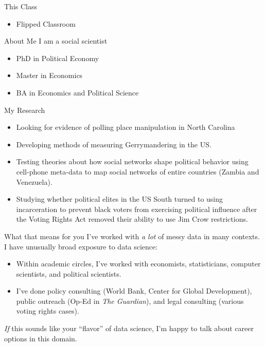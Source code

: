 \documentclass[11pt]{beamer}
\begin{document}
\begin{frame}[c]{This Class}
\begin{itemize}
	\item Flipped Classroom
\end{itemize}
\end{frame}

\begin{frame}[c]{About Me}
	I am a social scientist \\
	\vspace{0.5cm}
	\begin{itemize}
		\pause \item PhD in Political Economy
		\pause \item Master in Economics
		\pause \item BA in Economics and Political Science
	\end{itemize}
\end{frame}

\begin{frame}[c]{My Research}
	\begin{itemize}
		\pause \item Looking for evidence of polling place manipulation in North Carolina
		\pause \item Developing methods of measuring Gerrymandering in the US.
		\pause \item Testing theories about how social networks shape political behavior using cell-phone meta-data to map social networks of entire countries (Zambia and Venezuela).
		\pause \item Studying whether political elites in the US South turned to using incarceration to prevent black voters from exercising political influence after the Voting Rights Act removed their ability to use Jim Crow restrictions.
	\end{itemize}
\end{frame}

\begin{frame}[c]{What that means for you}
\pause I've worked with \emph{a lot} of messy data in many contexts. \\
\pause I have unusually broad exposure to data science:
\begin{itemize}
	\pause \item Within academic circles, I've worked with economists, statisticians, computer scientists, and political scientists.
	\pause \item I've done \alert{policy consulting} (World Bank, Center for Global Development), \alert{public outreach} (Op-Ed in \emph{The Guardian}), and \alert{legal consulting} (various voting rights cases).
\end{itemize}
\pause \emph{If} this sounds like your ``flavor'' of data science, I'm happy to talk about career options in this domain.
\end{frame}
\end{document}
